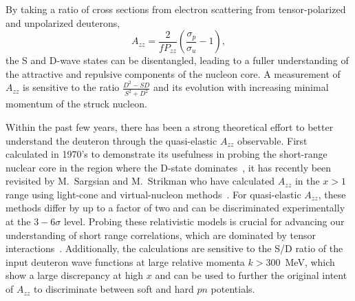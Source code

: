 By taking a ratio of cross sections from electron scattering from tensor-polarized and unpolarized deuterons, 
\begin{equation}
A_{zz}=\frac{2}{fP_{zz}}\left(\frac{\sigma_p}{\sigma_u}-1\right),
\end{equation}
the S and D-wave states can be disentangled, leading to a fuller understanding of the attractive and repulsive components of the nucleon core. A measurement of $A_{zz}$ is sensitive to the ratio $\frac{D^2-SD}{S^2+D^2}$ and its evolution with increasing minimal momentum of the struck nucleon. 

Within the past few years, there has been a strong theoretical effort to better understand the deuteron through the quasi-elastic $A_{zz}$ observable. First calculated in 1970's to demonstrate its usefulness in probing the short-range nuclear core in the region where the D-state dominates~\cite{Frankfurt:1988nt}, it has recently been revisited by M.~Sargsian and M.~Strikman who have calculated $A_{zz}$ in the $x > 1$ range using light-cone and virtual-nucleon methods~\cite{Sargsian:2014fla}. For quasi-elastic $A_{zz}$, these methods differ by up to a factor of two and can be discriminated experimentally at the $3-6\sigma$ level. Probing these relativistic models is crucial for advancing our understanding of short range correlations, which are dominated by tensor interactions~\cite{Korover:2014dma}. Additionally, the calculations are sensitive to the S/D ratio of the input deuteron wave functions at large relative momenta $k>300$~MeV, which show a large discrepancy at high $x$ and can be used to further the original intent of $A_{zz}$ to discriminate between soft and hard $pn$ potentials. 





